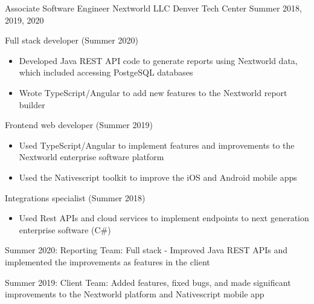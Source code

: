 \vspace{-2.0mm}

\begin{cventries}

  \cventry
    {Associate Software Engineer} %
    {Nextworld LLC} %
    {Denver Tech Center} %
    {Summer 2018, 2019, 2020} %
    {
      \begin{cvitems} %
        \ifcv
      \item {Full stack developer (Summer 2020)}
      \begin{itemize}
        \item {Developed Java REST API code to generate reports using Nextworld data, which included accessing PostgeSQL databases}
        \item {Wrote TypeScript/Angular to add new features to the Nextworld report builder}
      \end{itemize}
      \item {Frontend web developer (Summer 2019)}
      \begin{itemize}
            \item {Used TypeScript/Angular to implement features and
    improvements to the Nextworld enterprise software platform}
        \item {Used the Nativescript toolkit to improve the iOS and
    Android mobile apps}
    \end{itemize}
        \item {Integrations specialist (Summer 2018)}
        \begin{itemize}
                \item {Used Rest APIs and cloud services to implement
                            endpoints to next generation enterprise software (C\#)}
    \end{itemize}
    \else
    \item {Summer 2020: Reporting Team: Full stack - Improved Java REST APIs and implemented the improvements as features in the client}
    \item {Summer 2019: Client Team: Added features, fixed bugs, and made significant improvements to the Nextworld platform and Nativescript mobile app}

\end{cvitems}}
\end{cventries}
